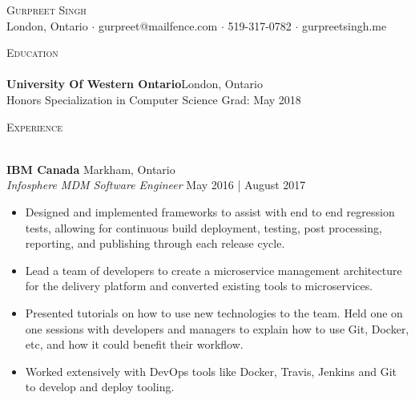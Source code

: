 \documentclass[a4paper]{article}
\newcommand{\lineunder} {
    \vspace*{-8pt} \\
    \hspace*{-18pt} \hrulefill \\
}
\newcommand{\header} [1] {
    {\hspace*{-18pt}\vspace*{6pt} \textsc{#1}}
    \vspace*{-6pt} \lineunder
}
\begin{document}
\vspace*{-40pt}

\vspace*{-10pt}
\begin{center}
	{\Huge \scshape {Gurpreet Singh}}\\
	London, Ontario $\cdot$ gurpreet@mailfence.com $\cdot$ 519-317-0782 $\cdot$ gurpreetsingh.me\\
\end{center}

\vspace*{2mm}

\header{Education}
\textbf{University Of Western Ontario}\hfill London, Ontario\\
Honors Specialization in Computer Science \hfill Grad: May 2018\\
\vspace{2mm}

\vspace*{2mm}

\header{Experience}
\vspace{1mm}

\textbf{IBM Canada} \hfill Markham, Ontario\\
\textit{Infosphere MDM Software Engineer} \hfill May 2016 | August 2017\\
\vspace{-1mm}
\begin{itemize} \itemsep 1pt
	\item Designed and implemented frameworks to assist with end to end regression tests, allowing for continuous build deployment, testing, post processing, reporting, and publishing through each release cycle.
	\item Lead a team of developers to create a microservice management architecture for the delivery platform and converted existing tools to microservices.
	\item Presented tutorials on how to use new technologies to the team. Held one on one sessions with developers and managers to explain how to use Git, Docker, etc, and how it could benefit their workflow.
	\item Worked extensively with DevOps tools like Docker, Travis, Jenkins and Git to develop and deploy tooling.
\end{itemize}
\end{document}
